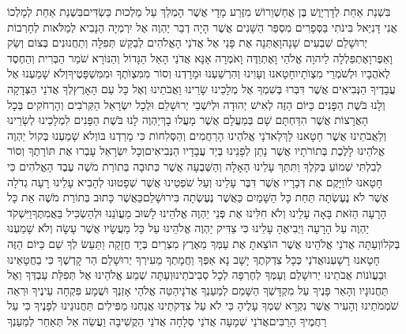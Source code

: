 \documentclass[../main/main.tex]{subfiles}
\begin{document}
\begin{multicols*}{\ncols}
בִּשְׁנַת אַחַת לְדָרְיָוֶשׁ בֶּן אֲחַשְׁוֵרוֹשׁ מִזֶּרַע מָדָי אֲשֶׁר הָמְלַךְ עַל מַלְכוּת כַּשְׂדִּים\PreVerseSpace{}בִּשְׁנַת אַחַת לְמָלְכוֹ אֲנִי דָּנִיֵּאל בִּינֹתִי בַּסְּפָרִים מִסְפַּר הַשָּׁנִים אֲשֶׁר הָיָה דְבַר יַהְוֶה אֶל יִרְמְיָה הַנָּבִיא לְמַלֹּאות לְחָרְבוֹת יְרוּשָׁלֵם שִׁבְעִים שָׁנָה\PreVerseSpace{}וָאֶתְּנָה אֶת פָּנַי אֶל אֲדֹנַי הָאֱלֹהִים לְבַקֵּשׁ תְּפִלָּה וְתַחֲנוּנִים בְּצוֹם וְשַׂק וָאֵפֶר\PreVerseSpace{}וָאֶתְפַּלְלָה לַיהוָה אֱלֹהַי וָאֶתְוַדֶּה וָאֹמְרָה אָנָּא אֲדֹנַי הָאֵל הַגָּדוֹל וְהַנּוֹרָא שֹׁמֵר הַבְּרִית וְהַחֶסֶד לְאֹהֲבָיו וּלְשֹׁמְרֵי מִצְוֺתָיו\PreVerseSpace{}חָטָאנוּ וְעָוִינוּ וְהִרְשַׁעְנוּ וּמָרָדְנוּ וְסוֹר מִמִּצְוֺתֶךָ וּמִמִּשְׁפָּטֶיךָ\PreVerseSpace{}וְלֹא שָׁמַעְנוּ אֶל עֲבָדֶיךָ הַנְּבִיאִים אֲשֶׁר דִּבְּרוּ בְּשִׁמְךָ אֶל מְלָכֵינוּ שָׂרֵינוּ וַאֲבֹתֵינוּ וְאֶל כָּל עַם הָאָרֶץ\PreVerseSpace{}לְךָ אֲדֹנַי הַצְּדָקָה וְלָנוּ בֹּשֶׁת הַפָּנִים כַּיּוֹם הַזֶּה לְאִישׁ יְהוּדָה וּלְיֹשְׁבֵי יְרוּשָׁלֵם וּלְכָל יִשְׂרָאֵל הַקְּרֹבִים וְהָרְחֹקִים בְּכָל הָאֲרָצוֹת אֲשֶׁר הִדַּחְתָּם שָׁם בְּמַעֲלָם אֲשֶׁר מָעֲלוּ בָךְ\PreVerseSpace{}יַהְוֶה לָנוּ בֹּשֶׁת הַפָּנִים לִמְלָכֵינוּ לְשָׂרֵינוּ וְלַאֲבֹתֵינוּ אֲשֶׁר חָטָאנוּ לָךְ\PreVerseSpace{}לַאדֹנָי אֱלֹהֵינוּ הָרַחֲמִים וְהַסְּלִחוֹת כִּי מָרַדְנוּ בּוֹ\PreVerseSpace{}וְלֹא שָׁמַעְנוּ בְּקוֹל יַהְוֶה אֱלֹהֵינוּ לָלֶכֶת בְּתוֹרֹתָיו אֲשֶׁר נָתַן לְפָנֵינוּ בְּיַד עֲבָדָיו הַנְּבִיאִים\PreVerseSpace{}וְכָל יִשְׂרָאֵל עָבְרוּ אֶת תּוֹרָתֶךָ וְסוֹר לְבִלְתִּי שְׁמוֹעַ בְּקֹלֶךָ וַתִּתַּךְ עָלֵינוּ הָאָלָה וְהַשְּׁבֻעָה אֲשֶׁר כְּתוּבָה בְּתוֹרַת מֹשֶׁה עֶבֶד הָאֱלֹהִים כִּי חָטָאנוּ לוֹ\PreVerseSpace{}וַיָּקֶם אֶת דְּבָרָיו אֲשֶׁר דִּבֶּר עָלֵינוּ וְעַל שֹׁפְטֵינוּ אֲשֶׁר שְׁפָטוּנוּ לְהָבִיא עָלֵינוּ רָעָה גְדֹלָה אֲשֶׁר לֹא נֶעֶשְׂתָה תַּחַת כָּל הַשָּׁמַיִם כַּאֲשֶׁר נֶעֶשְׂתָה בִּירוּשָׁלֵם\PreVerseSpace{}כַּאֲשֶׁר כָּתוּב בְּתוֹרַת מֹשֶׁה אֵת כָּל הָרָעָה הַזֹּאת בָּאָה עָלֵינוּ וְלֹא חִלִּינוּ אֶת פְּנֵי יַהְוֶה אֱלֹהֵינוּ לָשׁוּב מֵעֲוֺנֵנוּ וּלְהַשְׂכִּיל בַּאֲמִתֶּךָ\PreVerseSpace{}וַיִּשְׁקֹד יַהְוֶה עַל הָרָעָה וַיְבִיאֶהָ עָלֵינוּ כִּי צַדִּיק יַהְוֶה אֱלֹהֵינוּ עַל כָּל מַעֲשָׂיו אֲשֶׁר עָשָׂה וְלֹא שָׁמַעְנוּ בְּקֹלוֹ\PreVerseSpace{}וְעַתָּה אֲדֹנַי אֱלֹהֵינוּ אֲשֶׁר הוֹצֵאתָ אֶת עַמְּךָ מֵאֶרֶץ מִצְרַיִם בְּיָד חֲזָקָה וַתַּעַשׂ לְךָ שֵׁם כַּיּוֹם הַזֶּה חָטָאנוּ רָשָׁעְנוּ\PreVerseSpace{}אֲדֹנַי כְּכָל צִדְקֹתֶךָ יָשָׁב נָא אַפְּךָ וַחֲמָתְךָ מֵעִירְךָ יְרוּשָׁלֵם הַר קָדְשֶׁךָ כִּי בַחֲטָאֵינוּ וּבַעֲוֺנוֹת אֲבֹתֵינוּ יְרוּשָׁלֵם וְעַמְּךָ לְחֶרְפָּה לְכָל סְבִיבֹתֵינוּ\PreVerseSpace{}וְעַתָּה שְׁמַע אֱלֹהֵינוּ אֶל תְּפִלַּת עַבְדְּךָ וְאֶל תַּחֲנוּנָיו וְהָאֵר פָּנֶיךָ עַל מִקְדָּשְׁךָ הַשָּׁמֵם לְמַעַנְךָ\SubEnd{} אֲדֹנָי\PreVerseSpace{}הַטֵּה אֱלֹהַי אָזְנְךָ וּשֲׁמָע פִּקְחָה עֵינֶיךָ וּרְאֵה שֹׁמְמֹתֵינוּ וְהָעִיר אֲשֶׁר נִקְרָא שִׁמְךָ עָלֶיהָ כִּי לֹא עַל צִדְקֹתֵינוּ אֲנַחְנוּ מַפִּילִים תַּחֲנוּנֵינוּ לְפָנֶיךָ כִּי עַל רַחֲמֶיךָ הָרַבִּים\PreVerseSpace{}אֲדֹנַי שְׁמָעָה אֲדֹנַי סְלָחָה אֲדֹנַי הַקֲשִׁיבָה וַעֲשֵׂה אַל תְּאַחַר לְמַעַנְךָ 
\end{multicols*}
\end{document}
